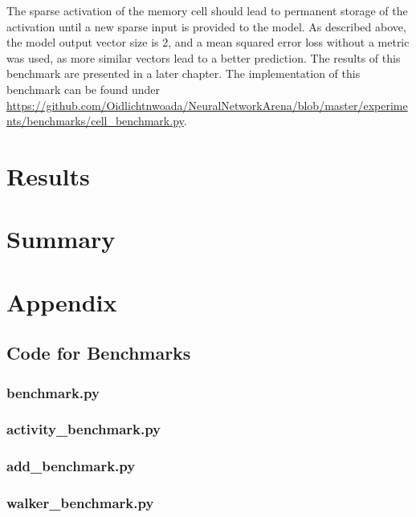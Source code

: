 \documentclass[draft,final]{vutinfth} %
\begin{document}
    The sparse activation of the memory cell should lead to permanent storage of the activation until a new sparse input is provided to the model.
    As described above, the model output vector size is $2$, and a mean squared error loss without a metric was used, as more similar vectors lead to a better prediction.
    The results of this benchmark are presented in a later chapter.
    The implementation of this benchmark can be found under \url{https://github.com/Oidlichtnwoada/NeuralNetworkArena/blob/master/experiments/benchmarks/cell_benchmark.py}.
    
    \chapter{Results}

    \chapter{Summary}

    \chapter{Appendix}
    
    \section{Code for Benchmarks}
    \subsection{benchmark.py}
    
    \subsection{activity\_benchmark.py}
    
    \subsection{add\_benchmark.py}
    
    \subsection{walker\_benchmark.py}
    
\end{document}
